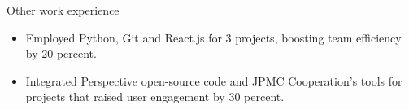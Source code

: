 \documentclass{resume}
\begin{document}
\begin{experienceSection}{Other work experience}
    \experienceItem[
        company={JP Morgan Chase Software Engineering Virtual Experience},
        location={Remote},
        position={SDE},
        duration={May 2023 - October 2023}
    ]
    \begin{itemize}
        \vspace{-0.2em}
        \itemsep -6pt {}
        \item Employed Python, Git and React.js for 3 projects, boosting team efficiency by 20 percent.
        \item Integrated Perspective open-source code and JPMC Cooperation’s tools for projects that raised user engagement by 30 percent.
    \end{itemize}

\end{experienceSection}
\end{document}
